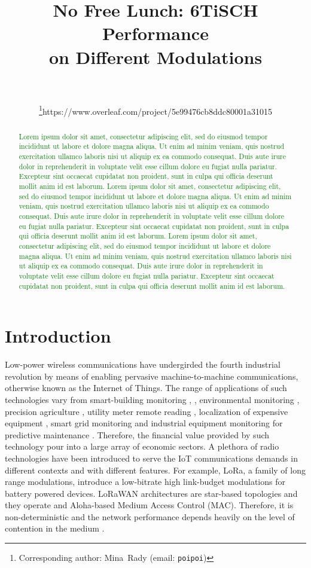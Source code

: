 \documentclass[journal]{IEEEtran}
\newcommand{\lorem}        {\textcolor{green}{Lorem ipsum dolor sit amet, consectetur adipiscing elit, sed do eiusmod tempor incididunt ut labore et dolore magna aliqua. Ut enim ad minim veniam, quis nostrud exercitation ullamco laboris nisi ut aliquip ex ea commodo consequat. Duis aute irure dolor in reprehenderit in voluptate velit esse cillum dolore eu fugiat nulla pariatur. Excepteur sint occaecat cupidatat non proident, sunt in culpa qui officia deserunt mollit anim id est laborum.}}
\begin{document}
\title{No Free Lunch: 6TiSCH Performance\\on Different Modulations}

\author{
    \\
    \\
    \thanks{Corresponding author: Mina~Rady (email: {\tt poipoi})}https://www.overleaf.com/project/5e99476cb8ddc80001a31015
}

\maketitle

\begin{abstract}
   \lorem
   \lorem
   \lorem
\end{abstract}

\tableofcontents

\section{Introduction}
\label{sec:introduction}


Low-power wireless communications have undergirded the fourth industrial revolution by means of enabling pervasive machine-to-machine communications, otherwise known as the Internet of Things.
The range of applications of such technologies vary from smart-building monitoring \cite{munoz18overview}, \cite{kazmi14review}, environmental monitoring \cite{munoz18evaluationa}, precision agriculture \cite{watteyne16peach}, utility meter remote reading \cite{sum17experimental}, localization of expensive equipment \cite{tanakademo}, smart grid monitoring \cite{fadel15survey} and industrial equipment monitoring for predictive maintenance \cite{civerchia17industrial}.
Therefore, the financial value provided by such technology pour into a large array of economic sectors.
A plethora of radio technologies have been introduced to serve the IoT communications demands in different contexts and with different features.
For example, LoRa, a family of long range modulations, introduce a low-bitrate high link-budget modulations for battery powered devices.
LoRaWAN architectures are star-based topologies and they operate and Aloha-based Medium Access Control (MAC).
Therefore, it is non-deterministic and the network performance depends heavily on the level of contention in the medium \cite{adelantado17understandinga}.
\end{document}
